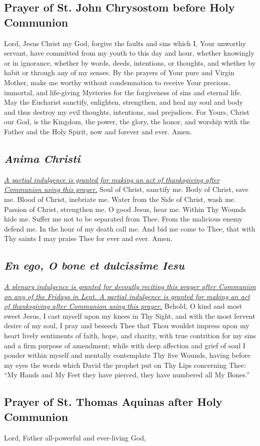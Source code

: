 \documentclass[12pt]{article}
\newcommand{\prayertitle}[1]{\subsection{#1}}
\newcommand{\indulgencedprayertitle}[1]{\prayertitle{#1 \protect\kreuz}}
\newcommand{\emphasis}[1]{\emph{#1}}
\newcommand{\emphasis}[1]{\textsl{#1}}
\newcommand{\foreign}[1]{\emphasis{#1}}
\newcommand{\note}[1]{{\small{\emphasis{#1}}}\newline}
\newcommand{\linkednote}[2]{\hyperlink{#1}{\note{#2}}}
\begin{document}
\prayertitle{Prayer of St. John Chrysostom before Holy Communion}
Lord, Jesus Christ my God, forgive the faults and sins which I, Your unworthy servant, have committed from my youth to this day and hour, whether knowingly or in ignorance, whether by words, deeds, intentions, or thoughts, and whether by habit or through any of my senses.
By the prayers of Your pure and Virgin Mother, make me worthy without condemnation to receive Your precious, immortal, and life-giving Mysteries for the forgiveness of sins and eternal life.
May the Eucharist sanctify, enlighten, strengthen, and heal my soul and body and thus destroy my evil thoughts, intentions, and prejudices.
For Yours, Christ our God, is the Kingdom, the power, the glory, the honor, and worship with the Father and the Holy Spirit, now and forever and ever.
Amen.

\indulgencedprayertitle{\foreign{Anima Christi}}
\linkednote{grant8}{A partial indulgence is granted for making an act of thanksgiving after Communion using this prayer.}
Soul of Christ, sanctify me.
Body of Christ, save me.
Blood of Christ, inebriate me.
Water from the Side of Christ, wash me.
Passion of Christ, strengthen me.
O good Jesus, hear me.
Within Thy Wounds hide me.
Suffer me not to be separated from Thee.
From the malicious enemy defend me.
In the hour of my death call me.
And bid me come to Thee,
that with Thy saints I may praise Thee for ever and ever.
Amen.

\indulgencedprayertitle{\foreign{En ego, O bone et dulcissime Iesu}}
\linkednote{grant8}{A plenary indulgence is granted for devoutly reciting this prayer after Communion on any of the Fridays in Lent. A partial indulgence is granted for making an act of thanksgiving after Communion using this prayer.}
Behold, O kind and most sweet Jesus, I cast myself upon my knees in Thy Sight, and with the most fervent desire of my soul, I pray and beseech Thee that Thou wouldst impress upon my heart lively sentiments of faith, hope, and charity, with true contrition for my sins and a firm purpose of amendment;
while with deep affection and grief of soul I ponder within myself and mentally contemplate Thy five Wounds, having before my eyes the words which David the prophet put on Thy Lips concerning Thee:
``My Hands and My Feet they have pierced, they have numbered all My Bones.''

\prayertitle{Prayer of St. Thomas Aquinas after Holy Communion}
Lord, Father all-powerful and ever-living God,
\end{document}
